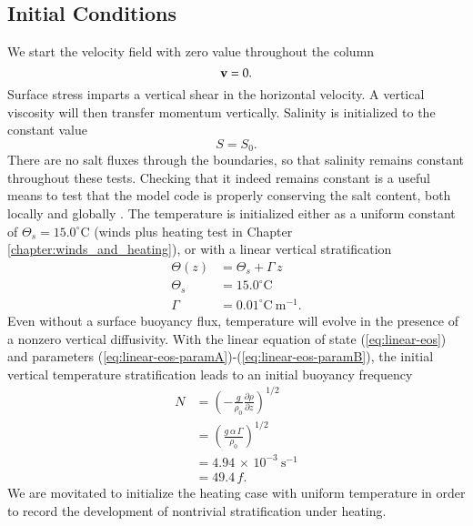 \subsection{Initial Conditions}

We start the velocity field with zero value throughout the column
\begin{equation}
 {\bf v} = 0.
\end{equation}
Surface stress imparts a vertical shear in the horizontal velocity.  A
vertical viscosity will then transfer momentum vertically.  Salinity
is initialized to the constant value
\begin{equation}
 S = S_{0}.
\end{equation}
There are no salt fluxes through the boundaries, so that salinity
remains constant throughout these tests.  Checking that it indeed
remains constant is a useful means to test that the model code is
properly conserving the salt content, both locally and globally
\citep{GriffiesPacSchmidtBalaji2001}.  The temperature is initialized
either as a uniform constant of $ \Theta_s = 15.0^{\circ}\mbox{C}$
(winds plus heating test in Chapter \ref{chapter:winds_and_heating}),
or with a linear vertical stratification
\begin{subequations}
\begin{align}
 \Theta(z) &= \Theta_s + \Gamma \, z  
\label{eq:linear-stratification}
\\
 \Theta_s&= 15.0^{\circ}\mbox{C} 
\label{eq:thetas}
\\
 \Gamma  &= 0.01^{\circ}\mbox{C}~\mbox{m}^{-1}. 
\end{align}
\end{subequations}
Even without a surface buoyancy flux, temperature will evolve in the
presence of a nonzero vertical diffusivity.  With the linear equation
of state (\ref{eq:linear-eos}) and parameters
(\ref{eq:linear-eos-paramA})-(\ref{eq:linear-eos-paramB}), the initial
vertical temperature stratification leads to an initial buoyancy
frequency
\begin{subequations}
\begin{align}
 N &= \left(-\frac{g}{\rho_{0}} \frac{\partial \rho}{\partial z} \right)^{1/2}
 \\
   &= \left( \frac{g \, \alpha \, \Gamma}{\rho_{0}} \right)^{1/2}
\\
  &= 4.94 \, \times \, 10^{-3}~\mbox{s}^{-1}
 \\
 &= 49.4 \, f.
\end{align}
\end{subequations}
We are movitated to initialize the heating case with uniform
temperature in order to record the development of nontrivial
stratification under heating. 



